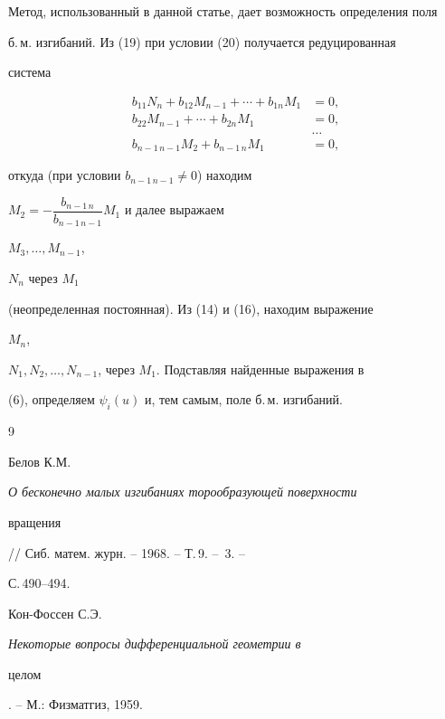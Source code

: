 Метод, использованный в данной статье, дает возможность определения поля


б.\,м. изгибаний. Из (19) при условии (20) получается редуцированная


система


\begin{align*}


b_{11}N_n+b_{12}M_{n-1}+\dotsb+b_{1n}M_1&=0,\\


b_{22}M_{n-1}+\dotsb+b_{2n}M_1&=0,\\


&\dots\\


b_{n-1\,n-1}M_2+b_{n-1\,n}M_1&=0,


\end{align*}


откуда (при условии $b_{n-1\,n-1}\ne 0$) находим


$M_2=-\dfrac{b_{n-1\,n}}{b_{n-1\,n-1}}M_1$ и далее выражаем


$M_3,\dotsc,M_{n-1}$,


$N_n$ через $M_1$


(неопределенная постоянная). Из (14) и (16), находим выражение


$M_n$,


$N_1,N_2,\dotsc,N_{n-1}$, через $M_1$. Подставляя найденные выражения в


(6), определяем $\psi_i(u)$ и, тем самым, поле б.\,м. изгибаний.





\begin{thebibliography}{9}







Белов К.М. {\em О бесконечно малых изгибаниях торообразующей поверхности


вращения} // Сиб. матем. журн. -- 1968. -- Т.\,9. -- \No\,3. --


С.\,490--494.




Кон-Фоссен С.Э. {\em Некоторые вопросы дифференциальной геометрии в


целом}. -- М.: Физматгиз, 1959.








\end{thebibliography}





\vskip 2cm















